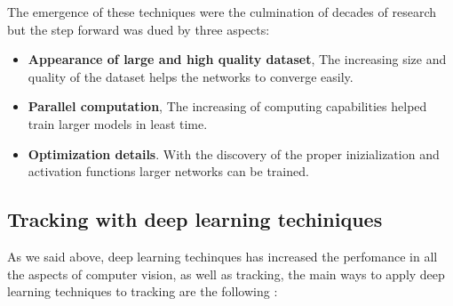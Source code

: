 \documentclass[12pt, a4paper, titlepage,twoside,openright]{article}
\begin{document}
The emergence of these techniques were the culmination of decades of research but the step forward was dued by three aspects:

\begin{itemize}

\item \textbf{Appearance of large and high quality dataset}, The increasing size and quality of the dataset helps the networks to converge easily.

\item \textbf{Parallel computation}, The increasing of computing capabilities helped train larger models in least time.

\item \textbf{Optimization details}. With the discovery of the proper inizialization and activation functions larger networks can be trained.


\end{itemize}


\subsection{Tracking with deep learning techiniques}

As we said above, deep learning techinques has increased the perfomance in all the aspects of computer vision, as well as tracking, the main ways to apply deep learning techniques to tracking are the following \cite{thrun}:
\end{document}
